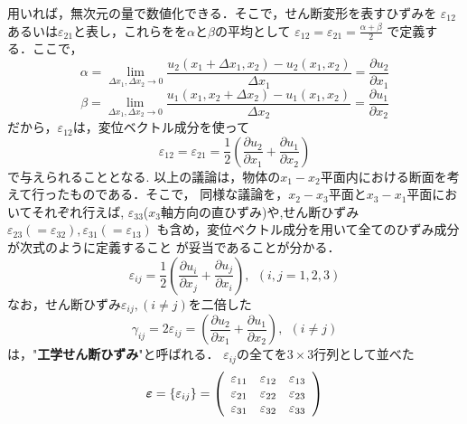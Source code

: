 \documentclass[10pt,a4j]{jbook}
\begin{document}
用いれば，無次元の量で数値化できる．そこで，せん断変形を表すひずみを
$\varepsilon_{12}$あるいは$\varepsilon_{21}$と表し，これらをを$\alpha$と$\beta$の平均として
$\varepsilon_{12}=\varepsilon_{21}=\frac{\alpha+\beta}{2}$
で定義する．ここで，
\begin{equation}
	\alpha=
	\lim_{\Delta x_1,\Delta x_2 \rightarrow 0}
	\frac{u_2(x_1+\Delta x_1,x_2)-u_2(x_1,x_2)}{\Delta x_1}
	=\frac{\partial u_2}{\partial x_1}
	\label{eqn:alpha}
\end{equation}
\begin{equation}
	\beta=
	\lim_{\Delta x_1,\Delta x_2 \rightarrow 0}
	\frac{u_1(x_1,x_2+\Delta x_2)-u_1(x_1,x_2)}{\Delta x_2}
	=\frac{\partial u_1}{\partial x_2}
	\label{eqn:alpha}
\end{equation}
だから，$\varepsilon_{12}$は，変位ベクトル成分を使って
\begin{equation}
	\varepsilon_{12}=
	\varepsilon_{21}=
	\frac{1}{2}
	\left(
	\frac{\partial u_2}{\partial x_1}
	+
	\frac{\partial u_1}{\partial x_2}
	\right)
	\label{eqn:def_e12}
\end{equation}
で与えられることとなる.
以上の議論は，物体の$x_1-x_2$平面内における断面を考えて行ったものである．そこで，
同様な議論を，$x_2-x_3$平面と$x_3-x_1$平面においてそれぞれ行えば,
$\varepsilon_{33}$($x_3$軸方向の直ひずみ)や,せん断ひずみ
$\varepsilon_{23}(=\varepsilon_{32}), \varepsilon_{31}(=\varepsilon_{13})$
も含め，変位ベクトル成分を用いて全てのひずみ成分が次式のように定義すること
が妥当であることが分かる．
\begin{equation}
	\varepsilon_{ij}=\frac{1}{2}
	\left(
	\frac{\partial u_i}{\partial x_j}
	+
	\frac{\partial u_j}{\partial x_i}
	\right), \ \ (i,j=1,2,3)
	\label{eqn:def_eij}
\end{equation}
なお，せん断ひずみ$\varepsilon_{ij},(i\neq j)$を二倍した
\begin{equation}
	\gamma_{ij}=2\varepsilon_{ij}
	=
	\left(
	\frac{\partial u_2}{\partial x_1}
	+
	\frac{\partial u_1}{\partial x_2}
	\right), \ \ (i\neq j)
	\label{eqn:def_g12}
\end{equation}
は，"{\bf 工学せん断ひずみ}"と呼ばれる．
$\varepsilon_{ij}$の全てを$3\times 3$行列として並べた
\begin{equation}
	\mbox{\boldmath $\varepsilon$}=\left\{ \varepsilon_{ij}\right\}
	=\left(
	\begin{array}{ccc}
		\varepsilon_{11} & \varepsilon_{12} & \varepsilon_{13}\\
		\varepsilon_{21} & \varepsilon_{22} & \varepsilon_{23}\\
		\varepsilon_{31} & \varepsilon_{32} & \varepsilon_{33}
	\end{array}
	\right)
	\label{eqn:def_emat}
\end{equation}
\end{document}
